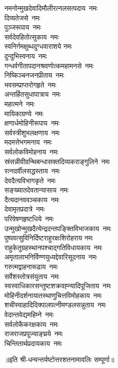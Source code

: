 \begin{multicols}{2}
\begin{flushleft}
नमनोन्मुखदेवादिमौलीरत्न\-लसत्पदाय~नमः\\
दिव्यतेजसे~नमः\\
पुञ्जरूपाय~नमः\\
सर्वदेवहितोत्सुकाय~नमः\\
स्वनिर्गमक्षुब्धदुग्धवाराशये नमः\hfill{}\\
दुन्दुभिस्वनाय~नमः\\
गन्धर्वगीतापदानश्रवणोत्क\-महामनसे~नमः\\
निष्किञ्चनजनप्रीताय~नमः\\
भवसम्प्राप्तरोगहृते~नमः\\
अन्तर्हितसुधापात्राय~नमः\\
महात्मने~नमः\\
मायिकाग्रण्ये~नमः\\
क्षणार्धमोहिनीरूपाय~नमः\\
सर्वस्त्रीशुभलक्षणाय~नमः\\
मदमत्तेभगमनाय~नमः\hfill{}\\
सर्वलोकविमोहनाय~नमः\\
स्रंसन्नीवीग्रन्थिबन्धासक्त\-दिव्यकराङ्गुलिने~नमः\\
रत्नदर्वीलसद्धस्ताय~नमः\\
देवदैत्यविभागकृते~नमः\\
सङ्ख्यातदेवतान्यासाय~नमः\\
दैत्यदानववञ्चकाय~नमः\\
देवामृतप्रदात्रे~नमः\\
परिवेषणहृष्टधिये~नमः\\
उन्मुखोन्मुखदैत्येन्द्रदन्त\-पङ्क्तिविभाजकाय~नमः\\
पुष्पवत्सुविनिर्दिष्टराहुरक्षः\-शिरोहराय नमः\hfill{}\\
राहुकेतुग्रहस्थानपश्चाद्गति\-विधायकाय~नमः\\
अमृतालाभनिर्विण्ण\-युध्यद्देवारि\-सूदनाय~नमः\\
गरुत्मद्वाहनारूढाय~नमः\\
सर्वेशस्तोत्रसंयुताय~नमः\\
स्वस्वाधिकारसन्तुष्ट\-शक्रवह्न्यादिपूजिताय~नमः\\
मोहिनीदर्शनायात\-स्थाणुचित्तविमोहकाय~नमः\\
शचीस्वाहादिदिक्पालपत्नी\-मण्डलसन्नुताय~नमः\\
वेदान्तवेद्यमहिम्ने~नमः\\
सर्वलोकैकरक्षकाय~नमः\\
राजराजप्रपूज्याङ्घ्रये~नमः\hfill{}\\
चिन्तितार्थप्रदायकाय~नमः\\
\end{flushleft}
\end{multicols}
॥इति श्री-धन्वन्तर्यष्टोत्तरशतनामावलिः सम्पूर्णा॥
